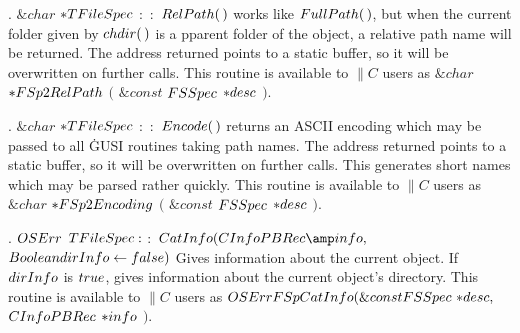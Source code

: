 \fi

. \CD{}$\&{char}$ ${{*}}\\{TFileSpec}$ $:$ $:$ $\\{RelPath}(\,)$\DC{}
works like \CD{}$\\{FullPath}(\,)$\DC{}, but when the current
folder given by \CD{}$\\{chdir}(\,)$\DC{} is a pparent folder of the object, a
relative path
name will be returned. The address returned points to a static buffer, so it
will be overwritten on further calls.
This routine is available to \CD{}$\|C$\DC{} users as
\CD{}$\&{char}$ ${{*}}\\{FSp2RelPath}$ $($ $\&{const}$ $\\{FSSpec}$ ${{*}}%
\\{desc}$ $)$\DC{}.

\fi

. \CD{}$\&{char}$ ${{*}}\\{TFileSpec}$ $:$ $:$ $\\{Encode}(\,)$\DC{}
returns an ASCII encoding which may be passed
to all \.{GUSI} routines taking path names. The address returned points to a
static buffer, so it will be overwritten on further calls. This generates
short names which may be parsed rather quickly.
This routine is available to \CD{}$\|C$\DC{} users as
\CD{}$\&{char}$ ${{*}}\\{FSp2Encoding}$ $($ $\&{const}$ $\\{FSSpec}$ ${{*}}%
\\{desc}$ $)$\DC{}.

\fi

. \CD{}$\\{OSErr}$ $\\{TFileSpec}:$ $:$ $\\{CatInfo}(\\{CInfoPBRec}\amp%
\\{info},\;$$\\{Boolean}\ \\{dirInfo}\leftarrow\\{false})$\DC{} Gives
information about the current object. If \CD{}$\\{dirInfo}$\DC{} is \CD{}$%
\\{true}$\DC{}, gives information
about the current object's directory.
This routine is available to \CD{}$\|C$\DC{} users as
\CD{}$\\{OSErr}\ \\{FSpCatInfo}(\&{const}\ \\{FSSpec}\ {{*}}\\{desc},\;$ $%
\\{CInfoPBRec}$ ${{*}}\\{info}$ $)$\DC{}.


